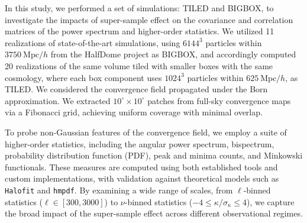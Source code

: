 In this study, we performed a set of simulations: TILED and BIGBOX, to investigate the impacts of super-sample effect on the covariance and correlation matrices of the power spectrum and higher-order statistics. We utilized 11 realizations of state-of-the-art simulations, using $6144^3$ particles within $3750\ \mathrm{Mpc}/h$ from the HalfDome project \citep{2024arXiv240717462B} as BIGBOX, and accordingly computed 20 realizations of the same volume tiled with smaller boxes with the same cosmology, where each box component uses $1024^3$ particles within $625\ \mathrm{Mpc}/h$, as TILED. We considered the convergence field propagated under the Born approximation. We extracted $10^\circ \times 10^\circ$ patches from full-sky convergence maps via a Fibonacci grid, achieving uniform coverage with minimal overlap.

To probe non-Gaussian features of the convergence field, we employ a suite of higher-order statistics, including the angular power spectrum, bispectrum, probability distribution function (PDF), peak and minima counts, and Minkowski functionals. These measures are computed using both established tools and custom implementations, with validation against theoretical models such as \texttt{Halofit} and \texttt{hmpdf}. By examining a wide range of scales, from $\ell$-binned statistics ($\ell \in [300, 3000]$) to $\nu$-binned statistics ($-4 \leq \kappa/\sigma_\kappa \leq 4$), we capture the broad impact of the super-sample effect across different observational regimes.

